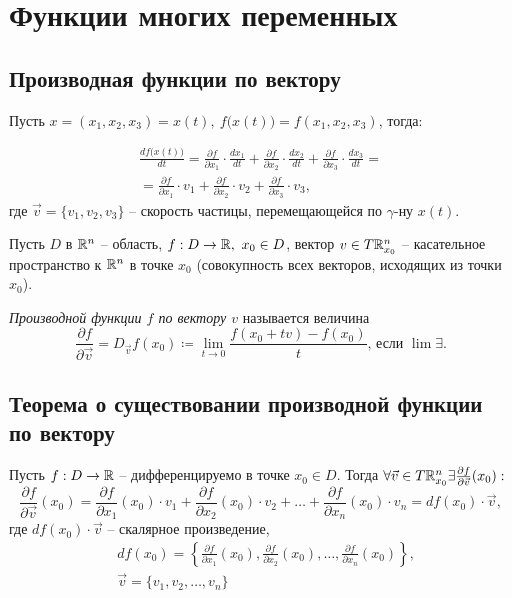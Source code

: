 \section{Функции многих переменных}

\subsection{Производная функции по вектору}

\begin{note}
    Пусть $ x = (x_1,x_2,x_3) = x(t), \ f\big(x(t)\big) = f(x_1,x_2,x_3)$, тогда:

    \begin{multline*}
        \frac{df\big(x(t)\big)}{dt} = \frac{\partial f}{\partial x_1} \cdot \frac{dx_1}{dt} + \frac{\partial f}{\partial x_2} \cdot \frac{dx_2}{dt} + \frac{\partial f}{\partial x_3} \cdot \frac{dx_3}{dt} = \\
        = \frac{\partial f}{\partial x_1} \cdot v_1 + \frac{\partial f}{\partial x_2} \cdot v_2 + \frac{\partial f}{\partial x_3} \cdot v_3,
    \end{multline*}
    где $\vec{v} = \{v_1,v_2,v_3\}$ -- скорость частицы, перемещающейся по $\gamma$-ну $x(t)$.
\end{note}

\begin{definition}
    Пусть $ D $ в $ \mathbb{R}^n $ -- область, $ f:D\rightarrow \mathbb{R}, \ x_0 \in D $, вектор $ v\in T\mathbb{R}_{x_0}^n $ -- касательное пространство к $ \mathbb{R}^n $ в точке $ x_0 $ (совокупность всех векторов, исходящих из точки $ x_0 $).

    \emph{Производной функции $ f $ по вектору $ v $} называется величина
    \[
        \frac{\partial f}{\partial \vec{v}} = D_{\vec{v}} f(x_0) \coloneqq \underset{t \rightarrow 0}{\lim}\frac{f(x_0 + tv) - f(x_0)}{t}\text{, если }\lim \exists.
    \]
\end{definition}

\subsection{Теорема о существовании производной функции по вектору}

\begin{statement}
    Пусть $ f:D\rightarrow\mathbb{R} $ -- дифференцируемо в точке $ x_0\in D $. Тогда $ \forall \vec{v}\in T\mathbb{R}_{x_0}^n \exists \frac{\partial f}{\partial \vec{v}}(x_0):$
    \[
        \frac{\partial f}{\partial \vec{v}}(x_0) = \frac{\partial f}{\partial x_1}(x_0) \cdot v_1 + \frac{\partial f}{\partial x_2}(x_0) \cdot v_2 + \ldots +\frac{\partial f}{\partial x_n}(x_0) \cdot v_n = df(x_0)\cdot \vec{v},
    \] где $df(x_0)\cdot \vec{v}$ -- скалярное произведение,
    \begin{align*}
         & df(x_0) = \left\{\frac{\partial f}{\partial x_1}(x_0), \frac{\partial f}{\partial x_2}(x_0), \ldots, \frac{\partial f}{\partial x_n}(x_0)\right\}, \\
         & \vec{v} = \{v_1,v_2,\ldots,v_n\}
    \end{align*}
\end{statement}

